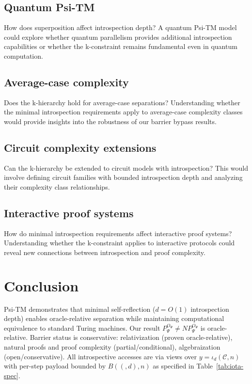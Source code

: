 \documentclass[11pt]{article}
\let\oldlog\log
\renewcommand{\log}{\oldlog_2}
\theoremstyle{plain}
\theoremstyle{definition}
\newcommand{\B}[2]{B(#1,#2)}  %
\begin{document}
\subsection{Quantum Psi-TM}
How does superposition affect introspection depth? A quantum Psi-TM model could explore whether quantum parallelism provides additional introspection capabilities or whether the k-constraint remains fundamental even in quantum computation.

\subsection{Average-case complexity}
Does the k-hierarchy hold for average-case separations? Understanding whether the minimal introspection requirements apply to average-case complexity classes would provide insights into the robustness of our barrier bypass results.

\subsection{Circuit complexity extensions}
Can the k-hierarchy be extended to circuit models with introspection? This would involve defining circuit families with bounded introspection depth and analyzing their complexity class relationships.

\subsection{Interactive proof systems}
How do minimal introspection requirements affect interactive proof systems? Understanding whether the k-constraint applies to interactive protocols could reveal new connections between introspection and proof complexity.

\section{Conclusion}

Psi-TM demonstrates that minimal self-reflection ($d = O(1)$ introspection depth) enables oracle-relative separation while maintaining computational equivalence to standard Turing machines. Our result $P^{O_\Psi}_\Psi \neq NP^{O_\Psi}_\Psi$ is oracle-relative. Barrier status is conservative: relativization (proven oracle-relative), natural proofs and proof complexity (partial/conditional), algebraization (open/conservative). All introspective accesses are via views over $y=\iota_d(\mathcal{C},n)$ with per-step payload bounded by $\B(d,n)$ as specified in Table~\ref{tab:iota-spec}.
\end{document}

